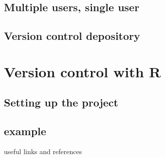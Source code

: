     
    
    \subsection{Multiple users, single user}
    
    
    
    \subsection{Version control depository}


\section{Version control with R}

\subsection{Setting up the project}

\subsection{example}



\begin{frame}
    
    useful links and references
    
\end{frame}

